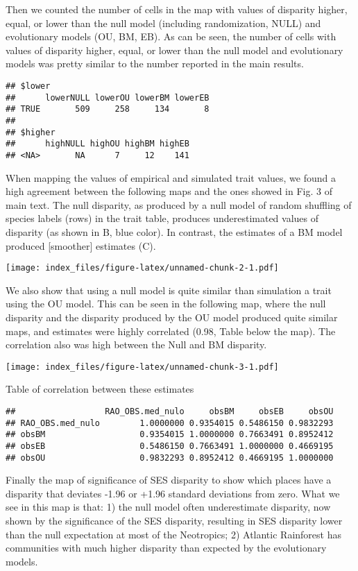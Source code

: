 \documentclass[
]{article}
\begin{document}
Then we counted the number of cells in the map with values of disparity
higher, equal, or lower than the null model (including randomization,
NULL) and evolutionary models (OU, BM, EB). As can be seen, the number
of cells with values of disparity higher, equal, or lower than the null
model and evolutionary models was pretty similar to the number reported
in the main results.

\begin{verbatim}
## $lower
##      lowerNULL lowerOU lowerBM lowerEB
## TRUE       509     258     134       8
## 
## $higher
##      highNULL highOU highBM highEB
## <NA>       NA      7     12    141
\end{verbatim}

When mapping the values of empirical and simulated trait values, we
found a high agreement between the following maps and the ones showed in
Fig. 3 of main text. The null disparity, as produced by a null model of
random shuffling of species labels (rows) in the trait table, produces
underestimated values of disparity (as shown in B, blue color). In
contrast, the estimates of a BM model produced {[}smoother{]} estimates
(C).

\texttt{[image: index\_files/figure-latex/unnamed-chunk-2-1.pdf]}

We also show that using a null model is quite similar than simulation a
trait using the OU model. This can be seen in the following map, where
the null disparity and the disparity produced by the OU model produced
quite similar maps, and estimates were highly correlated (0.98, Table
below the map). The correlation also was high between the Null and BM
disparity.

\texttt{[image: index\_files/figure-latex/unnamed-chunk-3-1.pdf]}

Table of correlation between these estimates

\begin{verbatim}
##                  RAO_OBS.med_nulo     obsBM     obsEB     obsOU
## RAO_OBS.med_nulo        1.0000000 0.9354015 0.5486150 0.9832293
## obsBM                   0.9354015 1.0000000 0.7663491 0.8952412
## obsEB                   0.5486150 0.7663491 1.0000000 0.4669195
## obsOU                   0.9832293 0.8952412 0.4669195 1.0000000
\end{verbatim}

Finally the map of significance of SES disparity to show which places
have a disparity that deviates -1.96 or +1.96 standard deviations from
zero. What we see in this map is that: 1) the null model often
underestimate disparity, now shown by the significance of the SES
disparity, resulting in SES disparity lower than the null expectation at
most of the Neotropics; 2) Atlantic Rainforest has communities with much
higher disparity than expected by the evolutionary models.
\end{document}
